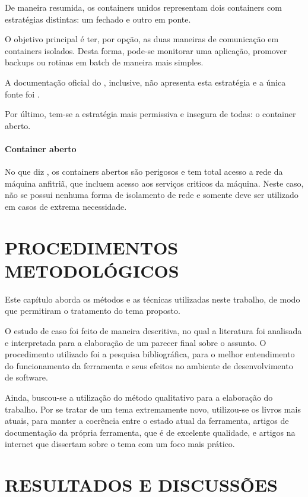 \documentclass[
	12pt,				%
	openright,			%
	oneside,			%
	a4paper,			%
	chapter=TITLE,		%
	section=TITLE,		%
	english,			%
	french,				%
	spanish,			%
	brazil				%
	]{abntex2}
\begin{document}
De maneira resumida, os containers unidos representam dois containers com estratégias distintas: um fechado e outro em ponte. 

O objetivo principal é ter, por opção, as duas maneiras de comunicação em containers isolados. Desta forma, pode-se monitorar uma aplicação, promover backups ou rotinas em batch de maneira mais simples.

A documentação oficial do , inclusive, não apresenta esta estratégia e a única fonte foi .

Por último, tem-se a estratégia mais permissiva e insegura de todas: o container aberto.

\subsubsection{Container aberto}

No que diz , os containers abertos são perigosos e tem total acesso a rede da máquina anfitriã, que incluem acesso aos serviços criticos da máquina. Neste caso, não se possui nenhuma forma de isolamento de rede e somente deve ser utilizado em casos de extrema necessidade. 

\chapter{PROCEDIMENTOS METODOLÓGICOS}

Este capítulo aborda os métodos e as técnicas utilizadas neste trabalho, de modo que permitiram o tratamento do tema proposto.

O estudo de caso foi feito de maneira descritiva, no qual a literatura foi analisada e interpretada para a elaboração de um parecer final sobre o assunto. O procedimento utilizado foi a pesquisa bibliográfica, para o melhor entendimento do funcionamento da ferramenta e seus efeitos no ambiente de desenvolvimento de software.

Ainda, buscou-se a utilização do método qualitativo para a elaboração do trabalho. Por se tratar de um tema extremamente novo, utilizou-se os livros mais atuais, para manter a coerência entre o estado atual da ferramenta, artigos de documentação da própria ferramenta, que é de excelente qualidade, e artigos na internet que dissertam sobre o tema com um foco mais prático.

\chapter{RESULTADOS E DISCUSSÕES}
\end{document}

